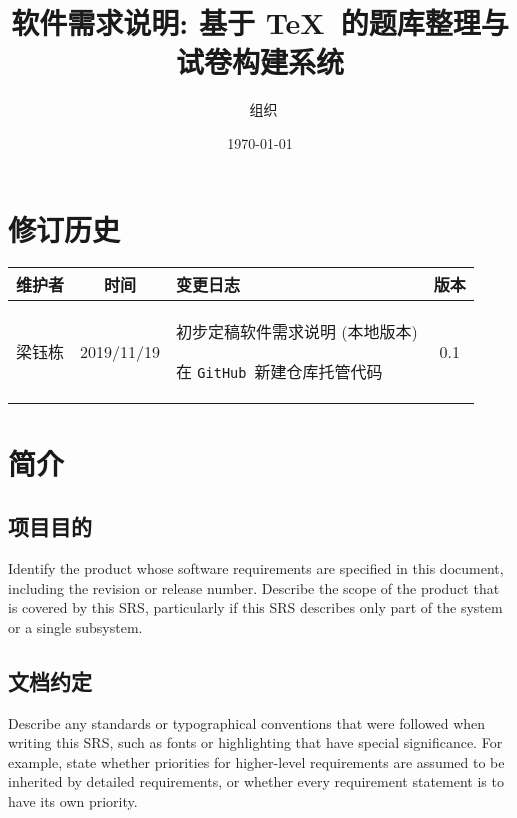 \documentclass{ctexart}
\title{软件需求说明: 基于 \TeX\ 的题库整理与试卷构建系统}
\author{\mathlang\ 组织}
\date{\today}
\newcommand{\github}{\texttt{GitHub}}
\begin{document}
\maketitle\tableofcontents\clearpage


\section{修订历史}
\begin{center}
    \begin{tabularx}{\textwidth}{|c|c|X|c|}
        \toprule
            维护者 & 时间 & 变更日志 & 版本\\
        \midrule
        \rowcolor[HTML]{EFEFEF}
            梁钰栋 & 2019/11/19 & \begin{itemize*}[itemjoin={\newline}]
                    \item 初步定稿软件需求说明 (本地版本)
                    \item 在 \github\ 新建仓库托管代码
                \end{itemize*} & 0.1 \\
        \bottomrule
    \end{tabularx}
\end{center}



\section{简介}
\subsection{项目目的}
Identify the product whose software requirements are specified in this 
document, including the revision or release number. Describe the scope of the 
product that is covered by this SRS, particularly if this SRS describes only 
part of the system or a single subsystem.


\subsection{文档约定}
Describe any standards or typographical conventions that were followed when 
writing this SRS, such as fonts or highlighting that have special significance.  
For example, state whether priorities  for higher-level requirements are assumed 
to be inherited by detailed requirements, or whether every requirement statement 
is to have its own priority.
\end{document}
